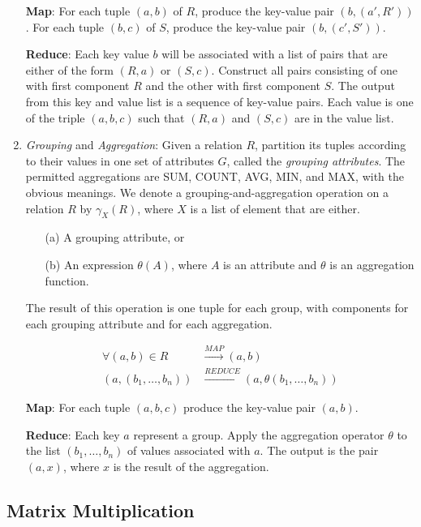 \begin{enumerate}
    \textbf{Map}: For each tuple $(a, b)$ of $R$, produce the key-value pair $(b, (a', R'))$. For each tuple $(b, c)$ of $S$, produce the key-value pair $(b, (c', S'))$.

    \textbf{Reduce}: Each key value $b$ will be associated with a list of pairs that are either of the form $(R, a)$ or $(S, c)$. Construct all pairs consisting of one with first component $R$ and the other with first component $S$. The output from this key and value list is a sequence of key-value pairs. Each value is one of the triple $(a, b, c)$ such that $(R, a)$ and $(S, c)$ are in the value list.

\item \textit{Grouping} and \textit{Aggregation}: Given a relation $R$, partition its tuples according to their values in one set of attributes $G$, called the \textit{grouping attributes}. The permitted aggregations are SUM, COUNT, AVG, MIN, and MAX, with the obvious meanings. We denote a grouping-and-aggregation operation on a relation $R$ by $\gamma_{X}(R)$, where $X$ is a list of element that are either.
    \begin{itemize}
        \item[(a)] A grouping attribute, or 
        \item[(b)] An expression $\theta(A)$, where $A$ is an attribute and $\theta$ is an aggregation function.
    \end{itemize}
    The result of this operation is one tuple for each group, with components for each grouping attribute and for each aggregation.

    \begin{equation*}
        \begin{split}
             \forall (a,b)\in R & \xrightarrow{MAP} (a,b)\\
            (a,(b_1,\dots,b_n)) &\xrightarrow{REDUCE} (a, \theta(b_1,\dots,b_n))
        \end{split}
    \end{equation*}

    \textbf{Map}: For each tuple $(a, b, c)$ produce the key-value pair $(a, b)$.

    \textbf{Reduce}: Each key $a$ represent a group. Apply the aggregation operator $\theta$ to the list $(b_1,\dots,b_n)$ of values associated with $a$. The output is the pair $(a, x)$, where $x$ is the result of the aggregation.

\end{enumerate}

\subsection{Matrix Multiplication}\label{subsec:matrix_multiplication}

